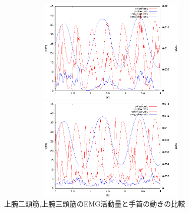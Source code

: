 \documentclass{jsarticle}
\begin{document}
\begin{figure}[htb]
  \begin{center}
    \includegraphics[width=17cm,height=5cm]{hikakudata1.eps}

    \includegraphics[width=17cm,height=5cm]{hikakudata2.eps}
    \caption{上腕二頭筋,上腕三頭筋のEMG活動量と手首の動きの比較}
    \label{hikaku2}
  \end{center}
\end{figure}
\end{document}

